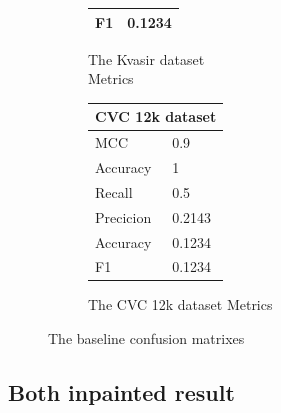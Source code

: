 \begin{figure}[h]
\begin{subfigure}[b]{0.49\textwidth}
\begin{tabular}{ll}
        F1                                     & 0.1234\\
        \bottomrule
\end{tabular}
\caption{The Kvasir dataset\\ Metrics}
\label{tab:kvasir_metrics_base}
\end{subfigure}%
\begin{subfigure}[b]{0.25\textwidth}
        \begin{tabular}{ll}
        \toprule
        \multicolumn{2}{c}{CVC 12k dataset}        \\
        \midrule
        MCC & 0.9    \\
        Accuracy                         & 1      \\
        Recall                              & 0.5    \\
        Precicion                        & 0.2143 \\
        Accuracy                        & 0.1234 \\
        F1                                     & 0.1234\\
        \bottomrule
        \end{tabular}
\caption{The CVC 12k dataset Metrics}
\label{tab:cvc12k_metrics_base}
\end{subfigure}
\caption{The baseline confusion matrixes}
\label{fig:BaselineCM}
\end{figure}

\FloatBarrier


\subsection{Both inpainted result}



